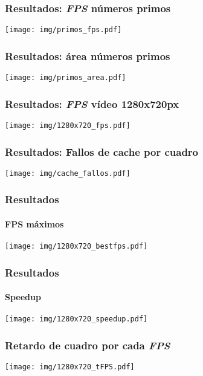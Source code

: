 \documentclass[11pt,a4paper,spanish]{beamer}
\begin{document}
\begin{frame}

\frametitle{Resultados: \emph{FPS} números primos}

\texttt{[image: img/primos\_fps.pdf]}

\end{frame}

\begin{frame}

\frametitle{Resultados: área números primos}

\texttt{[image: img/primos\_area.pdf]}

\end{frame}

\begin{frame}

\frametitle{Resultados: \emph{FPS} vídeo 1280x720px}

\texttt{[image: img/1280x720\_fps.pdf]}

\end{frame}

\begin{frame}

\frametitle{Resultados: Fallos de cache por cuadro}

\texttt{[image: img/cache\_fallos.pdf]}

\end{frame}

\begin{frame}

\frametitle{Resultados}

\framesubtitle{FPS máximos}

\texttt{[image: img/1280x720\_bestfps.pdf]}

\end{frame}

\begin{frame}

\frametitle{Resultados}

\framesubtitle{Speedup}

\texttt{[image: img/1280x720\_speedup.pdf]}

\end{frame}

\begin{frame}

\frametitle{Retardo de cuadro por cada \emph{FPS}}

\texttt{[image: img/1280x720\_tFPS.pdf]}

\end{frame}
\end{document}
